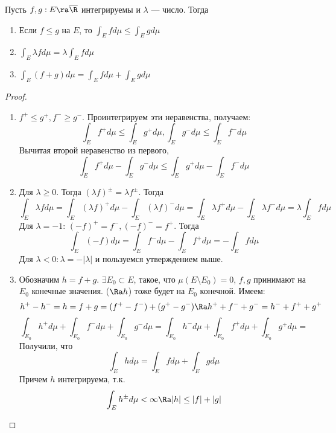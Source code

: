 \begin{theorem}
    Пусть \(f, g: E \ra \overline{\R}\) интегрируемы и \(\lambda\) --- число. Тогда
    \begin{enumerate}
        \item Если \(f \le g\) на \(E\), то \(\int_E f d \mu \le \int_E g d \mu\)
        \item \(\int_E \lambda f d \mu = \lambda \int_E f d \mu\)
        \item \(\int_E (f + g) d \mu = \int_E f d \mu + \int_E g d \mu\)
    \end{enumerate}
\end{theorem}
\begin{proof}\indent
    \begin{enumerate}
        \item \(f^+ \le g^+, f^- \ge g^-\). Проинтегрируем эти неравенства, получаем:
        \[\int_E f^+ d \mu \le \int_E g^+ d \mu, \int_E g^- d \mu \le \int_E f^- d \mu\]
        Вычитая второй неравенство из первого, 
        \[\int_E f^+ d \mu - \int_E g^- d \mu  \le \int_E g^+ d \mu - \int_E f^- d \mu\]
        \item Для \(\lambda \ge 0\). Тогда \((\lambda f)^\pm = \lambda f^\pm\). Тогда
        \[\int_E \lambda f d \mu = \int_E (\lambda f)^+ d \mu - \int_E (\lambda f)^- d \mu = \int_E \lambda f^+ d \mu - \int_E \lambda f^- d \mu = \lambda \int_E f d \mu\]
        Для \(\lambda = -1\): \((-f)^+ = f^-, (-f)^- = f^+\). Тогда
        \[\int_E (-f) d \mu = \int_E f^- d \mu - \int_E f^+ d \mu = -\int_E f d \mu\]
        Для \(\lambda < 0: \lambda = -|\lambda|\) и пользуемся утверждением выше.
        \item Обозначим \(h = f + g\). \(\exists E_0 \subset E\), такое, что \(\mu(E \setminus E_0) = 0\), \(f, g\) принимают на \(E_0\) конечные значения. (\(\Ra h\)) тоже будет на \(E_0\) конечной. Имеем:
        \[h^+ - h^- = h = f + g = (f^+ - f^-) + (g^+ - g^-) \Ra h^+ + f^- + g^- = h^- + f^+ + g^+\]
        \[\int_{E_0} h^+ d\mu + \int_{E_0} f^- d\mu + \int_{E_0} g^- d\mu = \int_{E_0} h^- d\mu + \int_{E_0} f^+ d\mu + \int_{E_0} g^+ d\mu = \]
        Получили, что
        \[\int_E h d \mu = \int_E f d \mu + \int_E g d \mu\]
        Причем \(h\) интегрируема, т.к.  
        \[\int_E h^\pm d\mu < \infty \Ra |h| \le |f| + |g|\]
    \end{enumerate}    
\end{proof}


